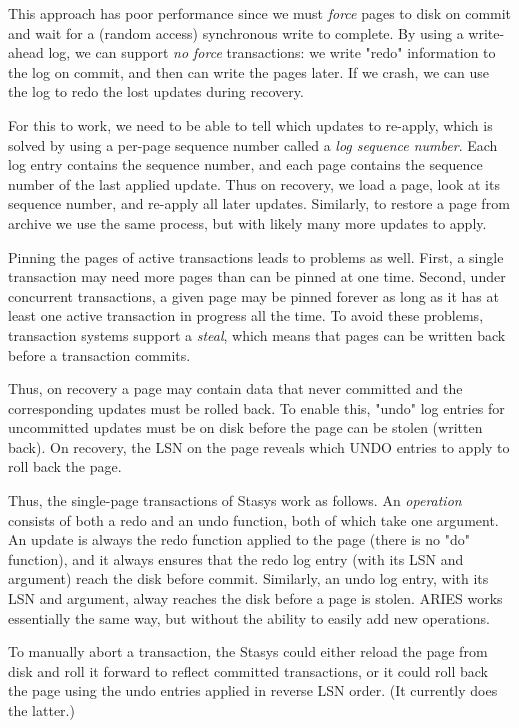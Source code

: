 \documentclass[letterpaper,twocolumn,10pt]{article}
\newcommand{\yad}{Stasys\xspace}
\begin{document}
This approach has poor performance since we must {\em force} pages to disk
on commit and wait for a (random access) synchronous write to
complete. By using a write-ahead log, we can support {\em no force}
transactions: we write "redo" information to the log on commit, and
then can write the pages later. If we crash, we can use the log to
redo the lost updates during recovery.

For this to work, we need to be able to tell which updates to
re-apply, which is solved by using a per-page sequence number called a
{\em log sequence number}. Each log entry contains the sequence
number, and each page contains the sequence number of the last applied
update.  Thus on recovery, we load a page, look at its sequence
number, and re-apply all later updates.  Similarly, to restore a page
from archive we use the same process, but with likely many more
updates to apply.

Pinning the pages of active transactions leads to problems as well.
First, a single transaction may need more pages than can be pinned at
one time. Second, under concurrent transactions, a given page may be
pinned forever as long as it has at least one active transaction in
progress all the time.  To avoid these problems, transaction systems
support a {\em steal}, which means that pages can be written back
before a transaction commits. 

Thus, on recovery a page may contain data that never committed and the
corresponding updates must be rolled back.  To enable this, "undo" log
entries for uncommitted updates must be on disk before the page can be
stolen (written back).  On recovery, the LSN on the page reveals which
UNDO entries to apply to roll back the page.

Thus, the single-page transactions of \yad work as follows.  An {\em
operation} consists of both a redo and an undo function, both of which
take one argument. An update is always the redo function applied to
the page (there is no "do" function), and it always ensures that the
redo log entry (with its LSN and argument) reach the disk before
commit.  Similarly, an undo log entry, with its LSN and argument,
alway reaches the disk before a page is stolen.  ARIES works
essentially the same way, but without the ability to easily add new
operations.

To manually abort a transaction, the \yad could either reload the page from disk and roll it forward to reflect committed transactions, or it could roll back the page using the undo entries applied in reverse LSN order. (It currently does the latter.)
\end{document}
